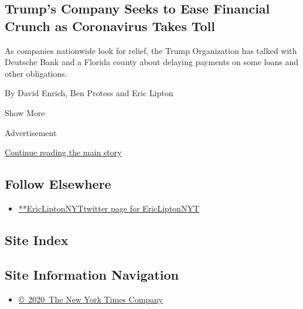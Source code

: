\begin{enumerate}
  \hypertarget{trumps-company-seeks-to-ease-financial-crunch-as-coronavirus-takes-toll}{%
  \subsection{Trump's Company Seeks to Ease Financial Crunch as
  Coronavirus Takes
  Toll}\label{trumps-company-seeks-to-ease-financial-crunch-as-coronavirus-takes-toll}}

  As companies nationwide look for relief, the Trump Organization has
  talked with Deutsche Bank and a Florida county about delaying payments
  on some loans and other obligations.

  By David Enrich, Ben Protess and Eric Lipton
\end{enumerate}

Show More

Advertisement

\protect\hyperlink{after-mid2}{Continue reading the main story}

\hypertarget{follow-elsewhere}{%
\subsection{Follow Elsewhere}\label{follow-elsewhere}}

\begin{itemize}
\tightlist
\item
  \href{https://twitter.com/EricLiptonNYT}{**EricLiptonNYTtwitter page
  for EricLiptonNYT}
\end{itemize}

\hypertarget{site-index}{%
\subsection{Site Index}\label{site-index}}

\hypertarget{site-information-navigation}{%
\subsection{Site Information
Navigation}\label{site-information-navigation}}

\begin{itemize}
\tightlist
\item
  \href{https://help.nytimes.com/hc/en-us/articles/115014792127-Copyright-notice}{©~2020~The
  New York Times Company}
\end{itemize}

